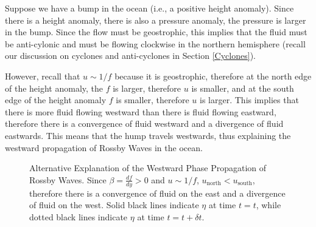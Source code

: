 Suppose we have a bump in the ocean (i.e., a positive height anomaly). Since there is a height anomaly, there is also a pressure anomaly, the pressure is larger in the bump. Since the flow must be geostrophic, this implies that the fluid must be anti-cylonic and must be flowing clockwise in the northern hemisphere (recall our discussion on cyclones and anti-cyclones in Section \ref{Cyclones}).

However, recall that $u\sim 1/f$ because it is geostrophic, therefore at the north edge of the height anomaly, the $f$ is larger, therefore $u$ is smaller, and at the south edge of the height anomaly $f$ is smaller, therefore $u$ is larger. This implies that there is more fluid flowing westward than there is fluid flowing eastward, therefore there is a convergence of fluid westward and a divergence of fluid eastwards. This means that the hump travels westwards, thus explaining the westward propagation of Rossby Waves in the ocean.

\begin{figure}[H]
    \centering
    \caption{Alternative Explanation of the Westward Phase Propagation of Rossby Waves. Since $\beta=\frac{df}{dy}>0$ and $u\sim 1/f$, $u_{\text{north}}<u_\text{south}$, therefore there is a convergence of fluid on the east and a divergence of fluid on the west. Solid black lines indicate $\eta$ at time $t=t$, while dotted black lines indicate $\eta$ at time $t=t+\delta t$.}
\end{figure}

